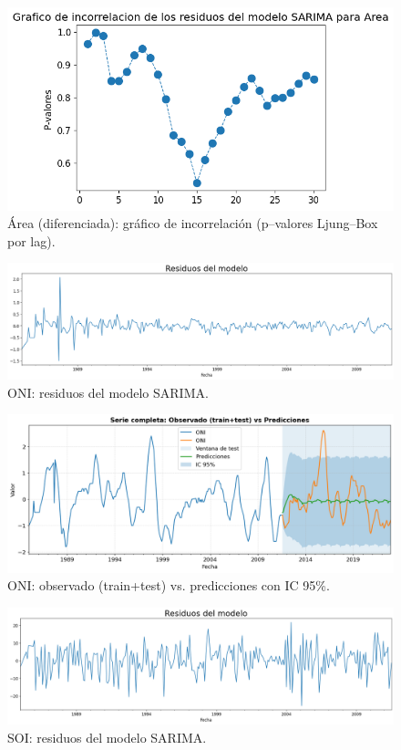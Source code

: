 \begin{figure}[H]\centering
\includegraphics[scale=.52]{Figures/inco_area_d.png}
\caption{Área (diferenciada): gráfico de incorrelación (p--valores Ljung--Box por lag).}
\label{fig:inco_area_d}
\end{figure}

\begin{figure}[H]\centering
\includegraphics[scale=.30]{Figures/res_sarima_oni.png}
\caption{ONI: residuos del modelo SARIMA.}
\label{fig:res_oni}
\end{figure}

\begin{figure}[H]\centering
\includegraphics[scale=.42]{Figures/pred_oni.png}
\caption{ONI: observado (train+test) vs. predicciones con IC 95\%.}
\label{fig:pred_oni}
\end{figure}



\begin{figure}[H]\centering
\includegraphics[scale=.30]{Figures/res_sarima_soi.png}
\caption{SOI: residuos del modelo SARIMA.}
\label{fig:res_soi}
\end{figure}


